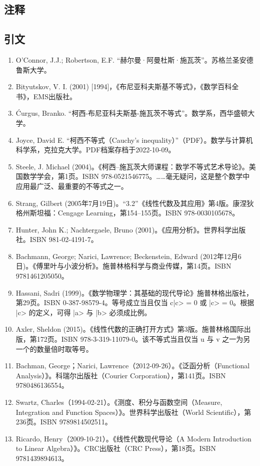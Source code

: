\subsection{注释}
\subsection{引文}
\begin{enumerate}
\item O'Connor, J.J.; Robertson, E.F. “赫尔曼·阿曼杜斯·施瓦茨”。苏格兰圣安德鲁斯大学。
\item Bityutskov, V. I. (2001) [1994]，《布尼亚科夫斯基不等式》，《数学百科全书》，EMS出版社。
\item Ćurgus, Branko. “柯西-布尼亚科夫斯基-施瓦茨不等式”。数学系，西华盛顿大学。
\item Joyce, David E. “柯西不等式（Cauchy's inequality）”（PDF）。数学与计算机科学系，克拉克大学。PDF档案存档于2022-10-09。
\item Steele, J. Michael (2004)。《柯西–施瓦茨大师课程：数学不等式艺术导论》。美国数学学会，第1页。ISBN 978-0521546775。……毫无疑问，这是整个数学中应用最广泛、最重要的不等式之一。
\item Strang, Gilbert (2005年7月19日)。“3.2”《线性代数及其应用》第4版。康涅狄格州斯坦福：Cengage Learning，第154–155页。ISBN 978-0030105678。
\item Hunter, John K.; Nachtergaele, Bruno (2001)。《应用分析》。世界科学出版社。ISBN 981-02-4191-7。
\item Bachmann, George; Narici, Lawrence; Beckenstein, Edward (2012年12月6日)。《傅里叶与小波分析》。施普林格科学与商业传媒，第14页。ISBN 9781461205050。
\item Hassani, Sadri (1999)。《数学物理学：其基础的现代导论》施普林格出版社，第29页。ISBN 0-387-98579-4。等号成立当且仅当 \<c|c> = 0 或 |c> = 0。根据 |c> 的定义，可得 |a> 与 |b> 必须成比例。
\item Axler, Sheldon (2015)。《线性代数的正确打开方式》第3版。施普林格国际出版，第172页。ISBN 978-3-319-11079-0。该不等式当且仅当 u 与 v 之一为另一个的数量倍时取等号。
\item Bachman, George；Narici, Lawrence（2012-09-26）。《泛函分析（Functional Analysis）》。科瑞尔出版社（Courier Corporation），第141页。ISBN 9780486136554。
\item Swartz, Charles（1994-02-21）。《测度、积分与函数空间（Measure, Integration and Function Spaces）》。世界科学出版社（World Scientific），第236页。ISBN 9789814502511。
\item Ricardo, Henry（2009-10-21）。《线性代数现代导论（A Modern Introduction to Linear Algebra）》。CRC出版社（CRC Press），第18页。ISBN 9781439894613。

\end{enumerate}
